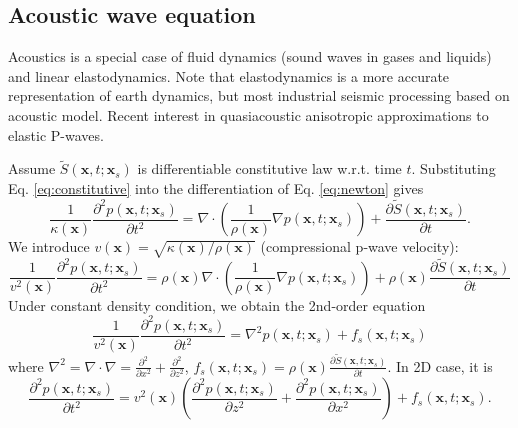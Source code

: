 \subsection{Acoustic wave equation}

Acoustics is a special case of fluid dynamics (sound waves in gases and liquids) and linear elastodynamics. Note that elastodynamics is a more accurate representation of earth dynamics, but most industrial seismic processing based on acoustic model. Recent interest in quasiacoustic anisotropic approximations to elastic P-waves.

Assume $\tilde{S}(\textbf{x},t;\textbf{x}_s)$ is differentiable constitutive law w.r.t. time $t$.
Substituting Eq. \eqref{eq:constitutive} into the differentiation of Eq. \eqref{eq:newton}  gives
\begin{equation}
\frac{1}{\kappa(\textbf{x})}\frac{\partial^2 p(\textbf{x},t;\textbf{x}_s)}{\partial t^2}
=\nabla\cdot \left(\frac{1}{\rho(\textbf{x})}\nabla p(\textbf{x},t; \textbf{x}_s)\right)
+\frac{\partial \tilde{S}(\textbf{x},t;\textbf{x}_s)}{\partial t}.
\end{equation}
We introduce $ v(\textbf{x})=\sqrt{\kappa(\textbf{x})/\rho(\textbf{x})} $ (compressional p-wave velocity):
\begin{equation}
\frac{1}{v^2(\textbf{x})}\frac{\partial^2 p(\textbf{x},t;\textbf{x}_s)}{\partial t^2}
=\rho(\textbf{x}) \nabla\cdot \left(\frac{1}{\rho(\textbf{x})}\nabla p(\textbf{x},t; \textbf{x}_s)\right)
+\rho(\textbf{x})\frac{\partial\tilde{S}(\textbf{x},t;\textbf{x}_s)}{\partial t}
\end{equation}
Under constant density condition, we obtain the 2nd-order equation
\begin{equation}\label{eq:scalar_wav}
\frac{1}{v^2(\textbf{x})}\frac{\partial^2 p(\textbf{x},t;\textbf{x}_s)}{\partial t^2}=\nabla^2 p(\textbf{x},t;\textbf{x}_s)+f_s(\textbf{x},t;\textbf{x}_s)
\end{equation}
where $\nabla^2=\nabla\cdot\nabla=\frac{\partial^2}{\partial x^2}+\frac{\partial^2}{\partial z^2}$, $f_s(\textbf{x},t;\textbf{x}_s)=\rho(\textbf{x})\frac{\partial\tilde{S}(\textbf{x},t;\textbf{x}_s)}{\partial t}$. In 2D case, it is
\begin{equation}
 \frac{\partial^2 p(\textbf{x},t;\textbf{x}_s)}{\partial t^2}
 =v^2(\textbf{x})\left(\frac{\partial^2 p(\textbf{x},t;\textbf{x}_s) }{\partial z^2} 
 +\frac{\partial^2 p(\textbf{x},t;\textbf{x}_s)}{\partial x^2}\right)+f_s(\textbf{x},t;\textbf{x}_s).
\end{equation}

